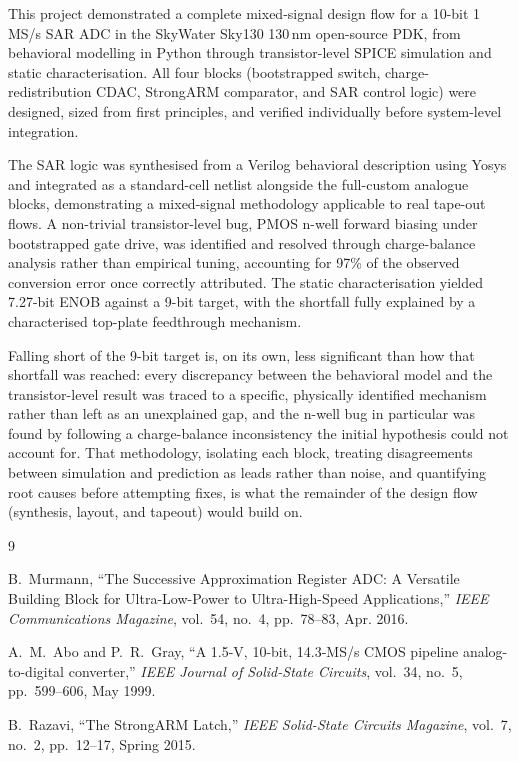 \documentclass[12pt, a4paper]{article}
\begin{document}
This project demonstrated a complete mixed-signal design flow for a 10-bit 1\,MS/s SAR ADC in the SkyWater Sky130 130\,nm open-source PDK, from behavioral modelling in Python through transistor-level SPICE simulation and static characterisation. All four blocks (bootstrapped switch, charge-redistribution CDAC, StrongARM comparator, and SAR control logic) were designed, sized from first principles, and verified individually before system-level integration.

The SAR logic was synthesised from a Verilog behavioral description using Yosys and integrated as a standard-cell netlist alongside the full-custom analogue blocks, demonstrating a mixed-signal methodology applicable to real tape-out flows. A non-trivial transistor-level bug, PMOS n-well forward biasing under bootstrapped gate drive, was identified and resolved through charge-balance analysis rather than empirical tuning, accounting for 97\% of the observed conversion error once correctly attributed. The static characterisation yielded 7.27-bit ENOB against a 9-bit target, with the shortfall fully explained by a characterised top-plate feedthrough mechanism.

Falling short of the 9-bit target is, on its own, less significant than how that shortfall was reached: every discrepancy between the behavioral model and the transistor-level result was traced to a specific, physically identified mechanism rather than left as an unexplained gap, and the n-well bug in particular was found by following a charge-balance inconsistency the initial hypothesis could not account for. That methodology, isolating each block, treating disagreements between simulation and prediction as leads rather than noise, and quantifying root causes before attempting fixes, is what the remainder of the design flow (synthesis, layout, and tapeout) would build on.

\begin{thebibliography}{9}

B.~Murmann, ``The Successive Approximation Register ADC: A Versatile Building Block for Ultra-Low-Power to Ultra-High-Speed Applications,'' \textit{IEEE Communications Magazine}, vol.~54, no.~4, pp.~78--83, Apr. 2016.

A.~M.~Abo and P.~R.~Gray, ``A 1.5-V, 10-bit, 14.3-MS/s CMOS pipeline analog-to-digital converter,'' \textit{IEEE Journal of Solid-State Circuits}, vol.~34, no.~5, pp.~599--606, May 1999.

B.~Razavi, ``The StrongARM Latch,'' \textit{IEEE Solid-State Circuits Magazine}, vol.~7, no.~2, pp.~12--17, Spring 2015.

\end{thebibliography}
\end{document}
